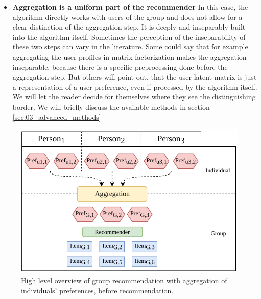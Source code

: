\begin{itemize}
    \item \textbf{Aggregation is a uniform part of the recommender} \newline
    In this case, the algorithm directly works with users of the group and does not allow for a clear distinction of the aggregation step. It is deeply and inseparably built into the algorithm itself. Sometimes the perception of the inseparability of these two steps can vary in the literature. Some could say that for example aggregating the user profiles in matrix factorization makes the aggregation inseparable, because there is a specific preprocessing done before the aggregation step. But others will point out, that the user latent matrix is just a representation of a user preference, even if processed by the algorithm itself. We will let the reader decide for themselves where they see the distinguishing border. We will briefly discuss the available methods in section \ref{sec:03_advanced_methods}
\end{itemize}

\begin{figure}[htbp]
    \centering
    \includegraphics{img/before-rec-aggregation.pdf}
    \caption{High level overview of group recommendation with aggregation of individuals' preferences, before recommendation.}
    \label{fig:before_rec_agg}
\end{figure}

